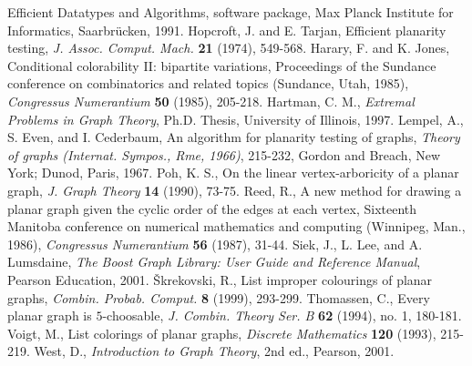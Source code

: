 \documentclass[letterpaper, 12pt]{article}
\theoremstyle{thm}
\begin{document}
\begin{thebibliography}{99}
{	Efficient Datatypes and Algorithms}, software package, Max Planck Institute
	for Informatics, Saarbr{\"u}cken, 1991.
	Hopcroft, J. and E. Tarjan, Efficient planarity testing, \textit{J. Assoc.
	Comput. Mach.} \textbf{21} (1974), 549-568.
	Harary, F. and K. Jones, Conditional colorability II: bipartite variations,
	Proceedings of the Sundance conference on combinatorics and related topics
	(Sundance, Utah, 1985), \textit{Congressus Numerantium} \textbf{50} (1985),
	205-218.
	Hartman, C. M.,
	\textit{Extremal Problems in Graph Theory}, Ph.D. Thesis, University of Illinois,
	1997.
	Lempel, A., S. Even, and I. Cederbaum, An algorithm for planarity testing of
	graphs, \textit{Theory of graphs (Internat. Sympos., Rme, 1966)}, 215-232,
	Gordon and Breach, New York; Dunod, Paris, 1967.
	Poh, K. S., On the linear vertex-arboricity of a planar graph,
	\emph{J. Graph Theory} \textbf{14} (1990), 73-75.
	Reed, R., A new method for drawing a planar graph given the cyclic order of the
	edges at each vertex, Sixteenth Manitoba conference on numerical
	mathematics and computing (Winnipeg, Man., 1986), \textit{Congressus
	Numerantium} \textbf{56} (1987), 31-44.
	Siek, J., L. Lee, and A. Lumsdaine, \textit{The Boost Graph Library: User
	Guide and Reference Manual}, Pearson Education, 2001.
	\v{S}krekovski, R., List improper colourings of planar graphs,
	\textit{Combin. Probab. Comput.} \textbf{8} (1999), 293-299.
	Thomassen, C., Every planar graph is $5$-choosable,
	\emph{J. Combin. Theory Ser. B} \textbf{62} (1994), no. 1, 180-181.
	Voigt, M., List colorings of planar graphs,
	\textit{Discrete Mathematics} \textbf{120} (1993), 215-219.
	West, D., \textit{Introduction to Graph Theory},
	2nd ed., Pearson, 2001.
\end{thebibliography}
\end{document}
